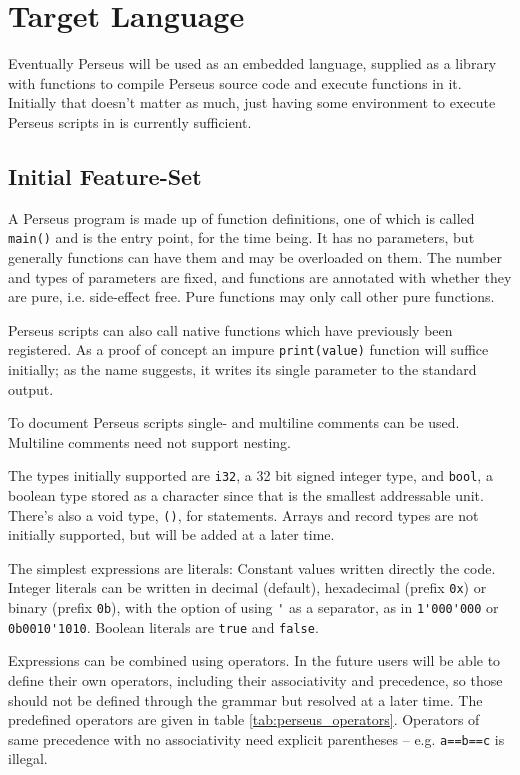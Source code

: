     \section{Target Language}
    
    	Eventually Perseus will be used as an embedded language, supplied as a library with functions to compile Perseus source code and execute functions in it. Initially that doesn't matter as much, just having some environment to execute Perseus scripts in is currently sufficient.
    	
    	\subsection{Initial Feature-Set}
    	
			A Perseus program is made up of function definitions, one of which is called \lstinline$main()$ and is the entry point, for the time being. It has no parameters, but generally functions can have them and may be overloaded on them. The number and types of parameters are fixed, and functions are annotated with whether they are pure, i.e. side-effect free. Pure functions may only call other pure functions.
			
			Perseus scripts can also call native functions which have previously been registered. As a proof of concept an impure \lstinline$print(value)$ function will suffice initially; as the name suggests, it writes its single parameter to the standard output.
			
			To document Perseus scripts single- and multiline comments can be used. Multiline comments need not support nesting.
			
			The types initially supported are \lstinline$i32$, a 32 bit signed integer type, and \lstinline$bool$, a boolean type stored as a character since that is the smallest addressable unit. There's also a void type, \lstinline$()$, for statements. Arrays and record types are not initially supported, but will be added at a later time.
	    	
	    	The simplest expressions are literals: Constant values written directly the code. Integer literals can be written in decimal (default), hexadecimal (prefix \lstinline$0x$) or binary (prefix \lstinline$0b$), with the option of using \lstinline$'$ as a separator, as in \lstinline$1'000'000$ or \lstinline$0b0010'1010$. Boolean literals are \lstinline$true$ and \lstinline$false$.
	    	
	    	Expressions can be combined using operators. In the future users will be able to define their own operators, including their associativity and precedence, so those should not be defined through the grammar but resolved at a later time. The predefined operators are given in table \ref{tab:perseus_operators}. Operators of same precedence with no associativity need explicit parentheses -- e.g. \lstinline$a==b==c$ is illegal.
	    	
